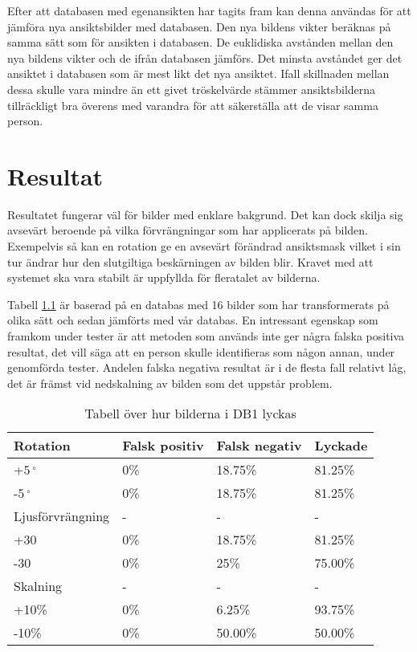 \documentclass[a4paper,12pt,oneside,final]{extbook}
\begin{document}
Efter att databasen med egenansikten har tagits fram kan denna användas för att jämföra nya ansiktsbilder med databasen. Den nya bildens vikter beräknas på samma sätt som för ansikten i databasen. De euklidiska avstånden mellan den nya bildens vikter och de ifrån databasen jämförs. Det minsta avståndet ger det ansiktet i databasen som är mest likt det nya ansiktet. Ifall skillnaden mellan dessa skulle vara mindre än ett givet tröskelvärde stämmer ansiktsbilderna tillräckligt bra överens med varandra för att säkerställa att de visar samma person.

\chapter{Resultat}
Resultatet fungerar väl för bilder med enklare bakgrund. Det kan dock skilja sig avsevärt beroende på vilka förvrängningar som har applicerats på bilden. Exempelvis så kan en rotation ge en avsevärt förändrad ansiktsmask vilket i sin tur ändrar hur den slutgiltiga beskärningen av bilden blir.  
Kravet med att systemet ska vara stabilt är uppfyllda för fleratalet av bilderna. 

Tabell \ref{table:results} är baserad på en databas med 16 bilder som har transformerats på olika sätt och sedan jämförts med vår databas. En intressant egenskap som framkom under tester är att metoden som används inte ger några falska positiva resultat, det vill säga att en person skulle identifieras som någon annan, under genomförda tester. Andelen falska negativa resultat är i de flesta fall relativt låg, det är främst vid nedskalning av bilden som det uppstår problem.

\begin{table}[h]
\caption{Tabell över hur bilderna i DB1 lyckas}
\begin{center}
    \begin{tabular}{ | l | l | l | p{5cm} |}
    \hline
    Rotation & Falsk positiv & Falsk negativ & Lyckade \\ \hline
    +$5\,^{\circ}$      & 0\%      & 18.75\%       & 81.25\%  \\ \hline
    -$5\,^{\circ}$      & 0\%      & 18.75\%       & 81.25\%  \\ \hline

    Ljusförvrängning & - & - & - \\ \hline
    +30 & 0\%   & 18.75\%         & 81.25\%  \\ \hline
    -30 & 0\%   & 25\%            & 75.00\%  \\ \hline

    Skalning & - & - & - \\ \hline
    +10\% & 0\%   & 6.25\%            & 93.75\%  \\ \hline
    -10\% & 0\%   & 50.00\%            & 50.00\%  \\ \hline
    \end{tabular}
    \label{table:results}
\end{center}
\end{table}
\end{document}

